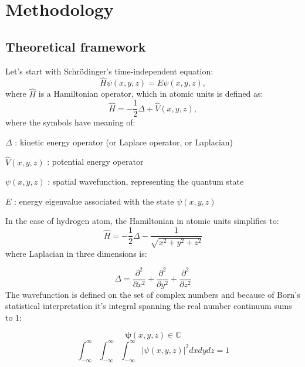 \section{Methodology}

\subsection{Theoretical framework}

Let's start with Schrödinger's time-independent equation:
\begin{equation}
	\hat{H} \psi(x,y,z) = E \psi(x,y,z),
\end{equation}
where \(\hat{H}\) is a Hamiltonian operator, which in atomic units is defined as:
	\begin{equation}
		\hat{H} = -\frac{1}{2} \Delta + \hat{V}(x,y,z),
	\end{equation}
where the symbols have meaning of:

\(\Delta\) : kinetic energy operator (or Laplace operator, or Laplacian)
		
\(\hat{V}(x,y,z)\) : potential energy operator
		
\(\psi(x,y,z)\) : spatial wavefunction, representing the quantum state
	
\(E\) : energy eigenvalue associated with the state \(\psi(x,y,z)\)
	
\noindent In the case of hydrogen atom, the Hamiltonian in atomic units simplifies to:
\begin{equation}
	\hat{H} = -\frac{1}{2}\Delta-\frac{1}{\sqrt{x^2+y^2+z^2}}
\end{equation}
where Laplacian in three dimensions is:

\begin{equation}
	\Delta = \frac{\partial^2}{\partial x^2} + \frac{\partial^2}{\partial y^2} + \frac{\partial^2}{\partial z^2}
\end{equation}
The wavefunction is defined on the set of complex numbers and because of Born's statistical interpretation it's integral spanning the real number continuum sums to 1:

\begin{equation}
	\boldsymbol{\psi}(x,y,z) \in \mathbb{C}
\end{equation}
\begin{equation}
	\int_{-\infty}^\infty\int_{-\infty}^{\infty}\int_{-\infty}^{\infty}\lvert \psi(x,y,z) \rvert^2 dx dy dz = 1
\end{equation}

